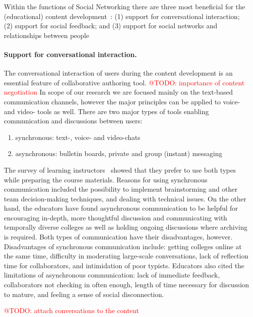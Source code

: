\documentclass[ngerman,UKenglish,table]{scrbook}
\makeatletter
\newcommand{\todo}[1]{\textcolor{red}{@TODO: #1}}
\makeatother
\begin{document}
Within the functions of Social Networking there are three most beneficial for the (educational) content development~\cite{boyd2007youth}:
(1) support for conversational interaction; (2) support for social feedback; and 
(3) support for social networks and relationships between people

\paragraph{Support for conversational interaction.}
The conversational interaction of users during the content development is an essential feature of collaborative authoring tool.
\todo{importance of content negotiation}
In scope of our research we are focused mainly on the text-based communication channels, however the major principles can be applied to voice- and video- tools as well.
There are two major types of tools enabling communication and discussions between users: 
\begin{enumerate}
\item{synchronous}: text-, voice- and video-chats
\item{asynchronous}: bulletin boards, private and group (instant) messaging
\end{enumerate}

The survey of learning instructors~\cite{branon2001synchronous} showed that they prefer to use both types while preparing the course materials.
Reasons for using synchronous communication included the possibility to implement brainstorming and other team decision-making techniques, and dealing with technical issues.
On the other hand, the educators have found asynchronous communication to be helpful for encouraging in-depth, more thoughtful discussion and communicating with temporally diverse colleges as well as holding ongoing discussions where archiving is required. 
Both types of communication have their disadvantages, however. Disadvantages of synchronous communication include: getting colleges online at the same time, difficulty in moderating large-scale conversations, lack of reflection time for collaborators, and intimidation of poor typists.
Educators also cited the limitations of asynchronous communication: lack of immediate feedback, collaborators not checking in often enough, length of time necessary for discussion to mature, and feeling a sense of social disconnection.



\todo{attach conversations to the content}
\end{document}
